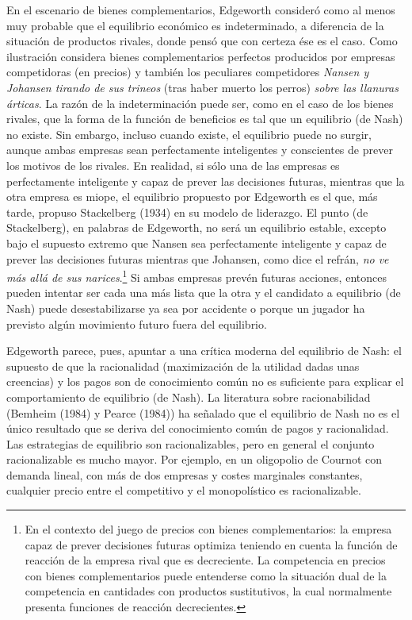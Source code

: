 \documentclass[10pt,a4paper]{article}
\begin{document}
En el escenario de bienes complementarios, Edgeworth consideró como al menos muy probable que el equilibrio económico es indeterminado, a diferencia de la situación de productos rivales, donde pensó que con certeza ése es el caso. Como ilustración considera bienes complementarios perfectos producidos por empresas competidoras (en precios) y también los peculiares competidores \textit{Nansen y Johansen tirando de sus trineos }(tras haber muerto los perros)\textit{ sobre las llanuras árticas}. La razón de la indeterminación puede ser, como en el caso de los bienes rivales, que la forma de la función de beneficios es tal que un equilibrio (de Nash) no existe. Sin embargo, incluso cuando existe, el equilibrio puede no surgir, aunque ambas empresas sean perfectamente inteligentes y conscientes de prever los motivos de los rivales. En realidad, si sólo una de las empresas es perfectamente inteligente y capaz de prever las decisiones futuras, mientras que la otra empresa es miope, el equilibrio propuesto por Edgeworth es el que, más tarde, propuso Stackelberg (1934) en su modelo de liderazgo. El punto (de Stackelberg), en palabras de Edgeworth, no será un equilibrio estable, excepto bajo el supuesto extremo que Nansen sea perfectamente inteligente y capaz de prever las decisiones futuras mientras que Johansen, como dice el refrán, \textit{no ve más allá de sus narices}.\footnote{%
    En el contexto del juego de precios con bienes complementarios: la empresa capaz de prever decisiones futuras optimiza teniendo en cuenta la función de reacción de la empresa rival que es decreciente. La competencia en precios con bienes complementarios puede entenderse como la situación dual de la competencia en cantidades con productos sustitutivos, la cual normalmente presenta funciones de reacción decrecientes.
} Si ambas empresas prevén futuras acciones, entonces pueden intentar ser cada una más lista que la otra y el candidato a equilibrio (de Nash) puede desestabilizarse ya sea por accidente o porque un jugador ha previsto algún movimiento futuro fuera del equilibrio. 

Edgeworth parece, pues, apuntar a una crítica moderna del equilibrio de Nash: el supuesto de que la racionalidad (maximización de la utilidad dadas unas creencias) y los pagos son de conocimiento común no es suficiente para explicar el comportamiento de equilibrio (de Nash). La literatura sobre racionabilidad (Bemheim (1984) y Pearce (1984)) ha señalado que el equilibrio de Nash no es el único resultado que se deriva del conocimiento común de pagos y racionalidad. Las estrategias de equilibrio son racionalizables, pero en general el conjunto racionalizable es mucho mayor. Por ejemplo, en un oligopolio de Cournot con demanda lineal, con más de dos empresas y costes marginales constantes, cualquier precio entre el competitivo y el monopolístico es racionalizable. 
\end{document}
